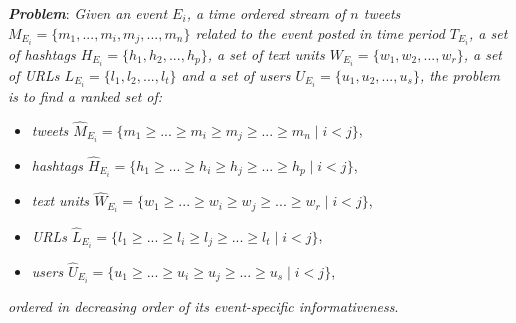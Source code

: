 
\noindent \textit{\textbf{Problem}}:
\noindent \textit{Given an event $E_{i}$, a time ordered stream of $n$ tweets $M_{E_{i}} = \{m_{1},...,m_{i},m_{j},..., m_{n} \}$ related to the event posted in time period $T_{E_{i}}$, a set of hashtags $H_{E_{i}} = \{h_{1},h_{2},..., h_{p} \}$, a set of text units $W_{E_{i}} = \{w_{1},w_{2},..., w_{r} \}$, a set of URLs $L_{E_{i}} = \{l_{1},l_{2},..., l_{t} \}$ and a set of users $U_{E_{i}} = \{u_{1},u_{2},..., u_{s} \}$,  the problem is to find a ranked set of:} 
\begin{itemize}
\item \textit{tweets $\hat{M}_{E_{i}} = \{m_{1} \ge...\ge m_{i} \ge m_{j} \ge...\ge m_{n} \mid  i < j\}$},
\item \textit{hashtags $\hat{H}_{E_{i}} = \{h_{1} \ge...\ge h_{i} \ge h_{j} \ge...\ge h_{p} \mid  i < j\}$}, 
\item \textit{text units $\hat{W}_{E_{i}} = \{w_{1} \ge...\ge w_{i} \ge w_{j} \ge...\ge w_{r} \mid  i < j\}$}, 
\item \textit{URLs $\hat{L}_{E_{i}} = \{l_{1} \ge...\ge l_{i} \ge l_{j} \ge...\ge l_{t} \mid  i < j\}$},
\item \textit{users $\hat{U}_{E_{i}} = \{u_{1} \ge...\ge u_{i} \ge u_{j} \ge...\ge u_{s} \mid  i < j\}$},

\end{itemize}
\textit{ordered in decreasing order of its event-specific informativeness}.

%



